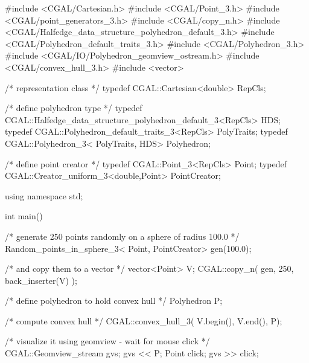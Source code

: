 \begin{cprog}
#include <CGAL/Cartesian.h>
#include <CGAL/Point_3.h>
#include <CGAL/point_generators_3.h>
#include <CGAL/copy_n.h>
#include <CGAL/Halfedge_data_structure_polyhedron_default_3.h>
#include <CGAL/Polyhedron_default_traits_3.h>
#include <CGAL/Polyhedron_3.h>
#include <CGAL/IO/Polyhedron_geomview_ostream.h>
#include <CGAL/convex_hull_3.h>
#include <vector>

/* representation class */
typedef CGAL::Cartesian<double>                                     RepCls;

/* define polyhedron type */
typedef CGAL::Halfedge_data_structure_polyhedron_default_3<RepCls>  HDS;
typedef CGAL::Polyhedron_default_traits_3<RepCls>                   PolyTraits;
typedef CGAL::Polyhedron_3< PolyTraits, HDS>                        Polyhedron;

/* define point creator */
typedef CGAL::Point_3<RepCls>                                       Point;
typedef CGAL::Creator_uniform_3<double,Point>                       PointCreator;

using namespace std;

int 
main()
{
  /* generate 250 points randomly on a sphere of radius 100.0 */
  Random_points_in_sphere_3< Point, PointCreator> gen(100.0);

  /* and copy them to a vector */
  vector<Point> V;
  CGAL::copy_n( gen, 250, back_inserter(V) );
  
  /* define polyhedron to hold convex hull */
  Polyhedron P;

  /* compute convex hull */
  CGAL::convex_hull_3( V.begin(), V.end(), P);

  /* visualize it using geomview - wait for mouse click */
  CGAL::Geomview_stream gvs;
  gvs << P;
  Point click;
  gvs >> click;
}
\end{cprog}


